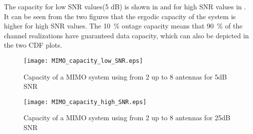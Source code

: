 The capacity for low SNR values(5 dB) is shown in  and for high SNR values in . It can be seen from the two figures that the ergodic capacity of the system is higher for high SNR values. The \SI{10}{\percent} outage capacity means that \SI{90}{\percent} of the channel realizations have guaranteed data capacity, which can also be depicted in the two CDF plots.
\begin{figure}[!h]
  \centering
  \texttt{[image: MIMO\_capacity\_low\_SNR.eps]}
  \caption{Capacity of a MIMO system using from 2 up to 8 antennas for 5dB SNR}
  \label{fig:MIMO_capacity_low_SNR}
\end{figure}
\begin{figure}[!h]
  \centering
  \texttt{[image: MIMO\_capacity\_high\_SNR.eps]}
  \caption{Capacity of a MIMO system using from 2 up to 8 antennas for 25dB SNR}
  \label{fig:MIMO_capacity_high_SNR}
\end{figure}

